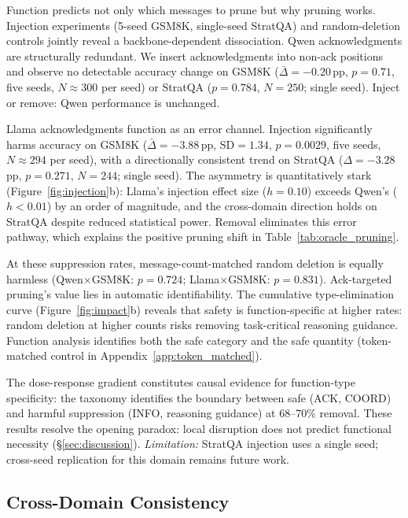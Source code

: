 Function predicts not only which messages to prune but why pruning works. Injection experiments (5-seed GSM8K, single-seed StratQA) and random-deletion controls jointly reveal a backbone-dependent dissociation.
Qwen acknowledgments are structurally redundant. We insert acknowledgments into non-ack positions and observe no detectable accuracy change on GSM8K ($\bar{\Delta} = -0.20$\,pp, $p = 0.71$, five seeds, $N \approx 300$ per seed) or StratQA ($p = 0.784$, $N = 250$; single seed). Inject or remove: Qwen performance is unchanged.

Llama acknowledgments function as an error channel. Injection significantly harms accuracy on GSM8K ($\bar{\Delta} = -3.88$\,pp, $\mathrm{SD} = 1.34$, $p = 0.0029$, five seeds, $N \approx 294$ per seed), with a directionally consistent trend on StratQA ($\Delta = -3.28$\,pp, $p = 0.271$, $N = 244$; single seed). The asymmetry is quantitatively stark (Figure~\ref{fig:injection}b): Llama's injection effect size ($h = 0.10$) exceeds Qwen's ($h < 0.01$) by an order of magnitude, and the cross-domain direction holds on StratQA despite reduced statistical power. Removal eliminates this error pathway, which explains the positive pruning shift in Table~\ref{tab:oracle_pruning}.

At these suppression rates, message-count-matched random deletion is equally harmless (Qwen$\times$GSM8K: $p = 0.724$; Llama$\times$GSM8K: $p = 0.831$). Ack-targeted pruning's value lies in automatic identifiability. The cumulative type-elimination curve (Figure~\ref{fig:impact}b) reveals that safety is function-specific at higher rates: random deletion at higher counts risks removing task-critical reasoning guidance. Function analysis identifies both the safe category and the safe quantity (token-matched control in Appendix~\ref{app:token_matched}).

The dose-response gradient constitutes causal evidence for function-type specificity: the taxonomy identifies the boundary between safe (ACK, COORD) and harmful suppression (INFO, reasoning guidance) at 68--70\% removal. These results resolve the opening paradox: local disruption does not predict functional necessity (\S\ref{sec:discussion}). \emph{Limitation:} StratQA injection uses a single seed; cross-seed replication for this domain remains future work.

\subsection{Cross-Domain Consistency}
\label{sec:cross_domain}

